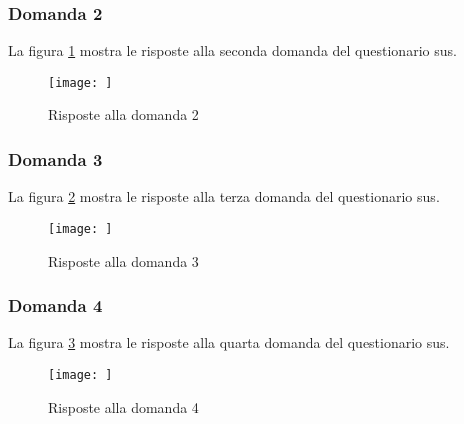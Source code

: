 \subsubsection*{Domanda 2}

\vspace{5pt}
\begin{minipage}{\textwidth}
  \par\noindent La figura \ref{fig:sus_q2} mostra le risposte alla seconda domanda del questionario \gls{sus}.
  \begin{figure}[H]
    \centering
    \texttt{[image: ]}
    \caption{Risposte alla domanda 2}
    \label{fig:sus_q2}
  \end{figure}
\end{minipage}

\subsubsection*{Domanda 3}

\vspace{5pt}
\begin{minipage}{\textwidth}
  \par\noindent La figura \ref{fig:sus_q3} mostra le risposte alla terza domanda del questionario \gls{sus}.
  \begin{figure}[H]
    \centering
    \texttt{[image: ]}
    \caption{Risposte alla domanda 3}
    \label{fig:sus_q3}
  \end{figure}
\end{minipage}

\subsubsection*{Domanda 4}

\vspace{5pt}
\begin{minipage}{\textwidth}
  \par\noindent La figura \ref{fig:sus_q4} mostra le risposte alla quarta domanda del questionario \gls{sus}.
  \begin{figure}[H]
    \centering
    \texttt{[image: ]}
    \caption{Risposte alla domanda 4}
    \label{fig:sus_q4}
  \end{figure}
\end{minipage}


